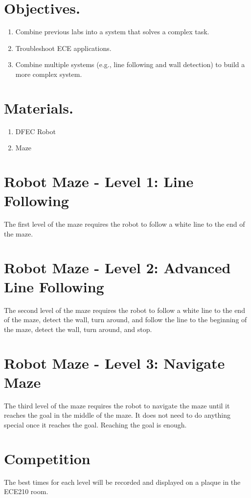 \documentclass{handout}
\begin{document}
	\maketitle
	
	\section{Objectives.} 
	\begin{enumerate}
		\item Combine previous labs into a system that solves a complex task. 
		\item Troubleshoot ECE applications.
		\item Combine multiple systems (e.g., line following and wall detection) to build a more complex system.
	\end{enumerate}
	
	\section{Materials.}
	\begin{enumerate}
		\item DFEC Robot
		\item Maze
	\end{enumerate}
	
	\section{Robot Maze - Level 1: Line Following}
	The first level of the maze requires the robot to follow a white line to the end of the maze.
	
	\section{Robot Maze - Level 2: Advanced Line Following}
	The second level of the maze requires the robot to follow a white line to the end of the maze, detect the wall, turn around, and follow the line to the beginning of the maze, detect the wall, turn around, and stop.
	
	\section{Robot Maze - Level 3: Navigate Maze}
	The third level of the maze requires the robot to navigate the maze until it reaches the goal in the middle of the maze. It does not need to do anything special once it reaches the goal. Reaching the goal is enough.
	
	\section{Competition}
	The best times for each level will be recorded and displayed on a plaque in the ECE210 room.
\end{document}
